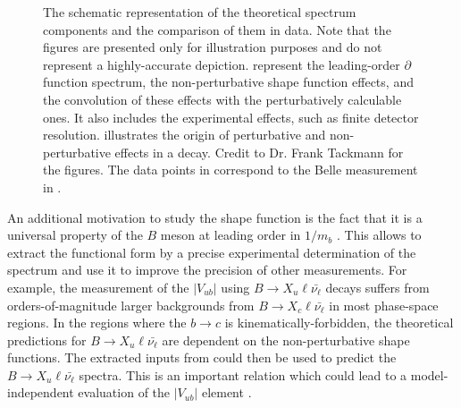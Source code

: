 \begin{figure}[htbp!]
    \caption{\label{fig:xsgamma_theory_sketches} 
    The schematic representation of the theoretical \BtoXsgamma spectrum components and the comparison of them in data.
    Note that the figures are presented only for illustration purposes and do not represent a highly-accurate depiction.
     represent the leading-order $\partial$ function spectrum, the non-perturbative shape function effects, and the convolution of these effects with the perturbatively calculable ones.
    It also includes the experimental effects, such as finite detector resolution.
     illustrates the origin of perturbative and non-perturbative effects in a \BtoXsgamma decay.
    Credit to Dr. Frank Tackmann for the figures. 
    The data points in  correspond to the Belle measurement in \cite{Belle:2009nth}.}
\end{figure}

An additional motivation to study the shape function is the fact that it is a universal property of the $B$ meson at leading order in $1/m_b$ \cite{Neubert:1993um,Bigi:1993ex}.
This allows to extract the functional form by a precise experimental determination of the \BtoXsgamma spectrum and use it to improve the precision of other measurements.
For example, the measurement of the $|V_{ub}|$ using $B\rightarrow X_u \ell \bar{\nu_{\ell}}$ decays suffers from orders-of-magnitude larger backgrounds from $B\rightarrow X_c \ell \bar{\nu_{\ell}}$ in most phase-space regions.
In the regions where the $b\to c$ is kinematically-forbidden, the theoretical predictions for $B\rightarrow X_u \ell \bar{\nu_{\ell}}$ are dependent on the non-perturbative shape functions.
The extracted inputs from \BtoXsgamma could then be used to predict the $B\rightarrow X_u \ell \bar{\nu_{\ell}}$ spectra.
This is an important relation which could lead to a model-independent evaluation of the $|V_{ub}|$ element \cite{Neubert:1993um}.

